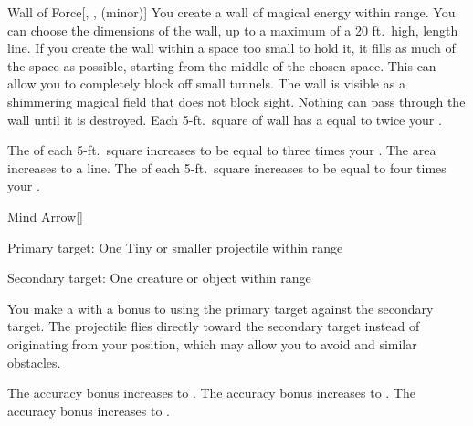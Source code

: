 \lowercase{\hypertarget{spell:Wall of Force}{}}\label{spell:Wall of Force}
\begin{freeability}[Rank 1]{\hypertarget{spell:Wall of Force}{Wall of Force}}[, ,  (minor)]
\targetrule
You create a wall of magical energy within \rngmed range.
You can choose the dimensions of the wall, up to a maximum of a 20 ft.\ high, \areamed length line.
If you create the wall within a space too small to hold it, it fills as much of the space as possible, starting from the middle of the chosen space.
This can allow you to completely block off small tunnels.
The wall is visible as a shimmering magical field that does not block sight.
Nothing can pass through the wall until it is destroyed.
Each 5-ft.\ square of wall has a  equal to twice your .

\rankline
{} The  of each 5-ft.\ square increases to be equal to three times your .
 The area increases to a \arealarge line.
 The  of each 5-ft.\ square increases to be equal to four times your .

\end{freeability}
\vspace{0.25em}



\lowercase{\hypertarget{spell:Mind Arrow}{}}\label{spell:Mind Arrow}
\begin{freeability}[Rank 2]{\hypertarget{spell:Mind Arrow}{Mind Arrow}}[]

Primary target: One Tiny or smaller  projectile within \rngmed range
\par\noindent
Secondary target: One creature or object within \rngmed range

You make a  with a  bonus to  using the primary target against the secondary target.
The projectile flies directly toward the secondary target instead of originating from your position, which may allow you to avoid  and similar obstacles.

\rankline
{} The accuracy bonus increases to .
 The accuracy bonus increases to .
 The accuracy bonus increases to .

\end{freeability}
\vspace{0.25em}



